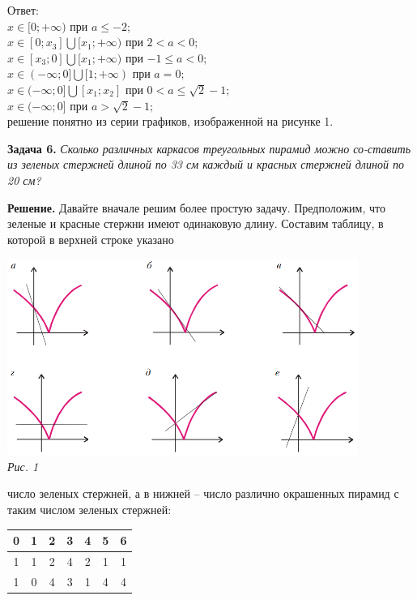 {\begin{multicols}{3}
Ответ:\\
$x \in [0;+\infty)$ при $a \leq -2;$ \\
$x \in [0;x_3]\bigcup[x_1;+\infty)$ при $2 < a < 0;$ \\
$x \in [x_3;0]\bigcup[x_1;+\infty)$ при $-1\leq a<0;$ \\
$x \in (-\infty;0]\bigcup[1;+\infty)$ при $a=0;$ \\
$x \in (-\infty;0]\bigcup[x_1;x_2]$ при $0 < a \leq \sqrt{2} - 1;$ \\
$x \in (-\infty;0]$ при $a > \sqrt{2} - 1;$ \\
решение понятно из серии графиков, изображенной на рисунке 1. \par
\textbf{Задача 6.} \textsl{Сколько различных каркасов
треугольных пирамид можно со-ставить из зеленых стержней
длиной по 33 см каждый и красных стержней длиной по 20 см?} \par
\textbf{Решение.}  Давайте вначале решим более
простую задачу. Предположим, что зеленые и красные
стержни имеют одинаковую длину. Составим таблицу,
в которой в верхней строке указано
\begin{minipage}{\linewidth}
\includegraphics[height=6.4cm]{images/picture1.png} \\
\textsl{Рис. 1} \\
\end{minipage}
число зеленых стержней, а в нижней –
число различно окрашенных пирамид с
таким числом зеленых стержней:
\begin{center}
\begin{tabular}{|c|c|c|c|c|c|c|} 
\hline
0 & 1 & 2 & 3 & 4 & 5 & 6 \\ 
\hline
1 & 1 & 2 & 4 & 2 & 1 & 1 \\
\hline
1 & 0 & 4 & 3 & 1 & 4 & 4 \\
\hline
\end{tabular}

\end{center}
\end{multicols}}
